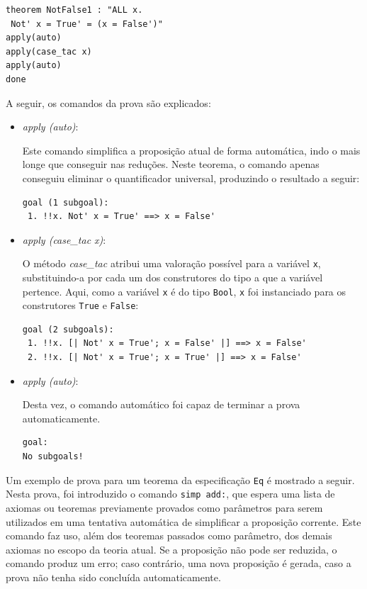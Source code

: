 \begin{Verbatim}
theorem NotFalse1 : "ALL x.
 Not' x = True' = (x = False')"
apply(auto)
apply(case_tac x)
apply(auto)
done
\end{Verbatim}

A seguir, os comandos da prova são explicados:
\begin{itemize}
\item \textit{apply (auto)}:

Este comando simplifica a proposição atual de forma automática, indo o mais longe que conseguir nas reduções.
Neste teorema, o comando apenas conseguiu eliminar o quantificador universal, produzindo o resultado a seguir:

\begin{Verbatim}
goal (1 subgoal):
 1. !!x. Not' x = True' ==> x = False'
\end{Verbatim}

\item \textit{apply (case\_tac x)}:

O método \textit{case\_tac} atribui uma valoração possível para a variável \Verb.x., substituindo-a por cada um dos construtores do tipo a que a variável pertence.
Aqui, como a variável \Verb.x. é do tipo \Verb.Bool., \Verb.x. foi instanciado para os construtores \Verb.True. e \Verb.False.:

\begin{Verbatim}
goal (2 subgoals):
 1. !!x. [| Not' x = True'; x = False' |] ==> x = False'
 2. !!x. [| Not' x = True'; x = True' |] ==> x = False'
\end{Verbatim}

\item \textit{apply (auto)}:

Desta vez, o comando automático foi capaz de terminar a prova automaticamente.

\begin{Verbatim}
goal:
No subgoals!
\end{Verbatim}

\end{itemize}

Um exemplo de prova para um teorema da especificação \Verb.Eq. é mostrado a seguir.
Nesta prova, foi introduzido o comando \Verb.simp add:., que espera uma lista de axiomas ou teoremas previamente provados como parâmetros para serem utilizados em uma tentativa automática de simplificar a proposição corrente.
Este comando faz uso, além dos teoremas passados como parâmetro, dos demais axiomas no escopo da teoria atual.
Se a proposição não pode ser reduzida, o comando produz um erro; caso contrário, uma nova proposição é gerada, caso a prova não tenha sido concluída automaticamente.

